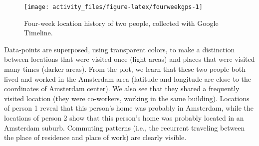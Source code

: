 \documentclass[]{book}
\newenvironment{Shaded}{\begin{snugshade}}{\end{snugshade}}
\newcommand{\KeywordTok}[1]{\textcolor[rgb]{0.13,0.29,0.53}{\textbf{#1}}}
\newcommand{\DataTypeTok}[1]{\textcolor[rgb]{0.13,0.29,0.53}{#1}}
\newcommand{\DecValTok}[1]{\textcolor[rgb]{0.00,0.00,0.81}{#1}}
\newcommand{\FloatTok}[1]{\textcolor[rgb]{0.00,0.00,0.81}{#1}}
\newcommand{\StringTok}[1]{\textcolor[rgb]{0.31,0.60,0.02}{#1}}
\newcommand{\CommentTok}[1]{\textcolor[rgb]{0.56,0.35,0.01}{\textit{#1}}}
\newcommand{\OperatorTok}[1]{\textcolor[rgb]{0.81,0.36,0.00}{\textbf{#1}}}
\newcommand{\NormalTok}[1]{#1}
\begin{document}
\begin{Shaded}
\end{Shaded}

\begin{figure}

{\centering \texttt{[image: activity\_files/figure-latex/fourweekgps-1]} 

}

\caption{Four-week location history of two people, collected with Google Timeline.}\label{fig:fourweekgps}
\end{figure}

Data-points are superposed, using transparent colors, to make a
distinction between locations that were visited once (light areas) and
places that were visited many times (darker areas). From the plot, we
learn that these two people both lived and worked in the Amsterdam area
(latitude and longitude are close to the coordinates of Amsterdam
center). We also see that they shared a frequently visited location
(they were co-workers, working in the same building). Locations of
person 1 reveal that this person's home was probably in Amsterdam, while
the locations of person 2 show that this person's home was probably
located in an Amsterdam suburb. Commuting patterns (i.e., the recurrent
traveling between the place of residence and place of work) are clearly
visible.
\end{document}
